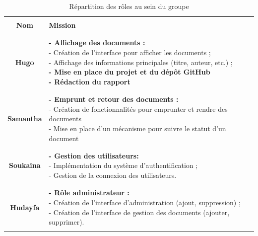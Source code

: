 \documentclass[12pt,a4paper]{article}
\begin{document}
\begin{table}[!h]
	\centering
		\begin{tabular}{|c|l|}
			\hline
			& \\
			\textbf{Nom} & \textbf{Mission} \\ 
			& \\\hline
			& \\
			\textbf{Hugo} & \makecell[l]{\textbf{- Affichage des documents :} \\ \hspace{.5cm} - Création de l'interface pour afficher les documents ; \\ \hspace{.5cm} - Affichage des informations principales (titre, auteur, etc.) ; \\ \textbf{- Mise en place du projet et du dépôt GitHub} \\ \textbf{- Rédaction du rapport}}\\ 
			& \\ \hline
			& \\
			\textbf{Samantha} & \makecell[l]{\textbf{- Emprunt et retour des documents :} \\ \hspace{.5cm} - Création de fonctionnalités pour emprunter et rendre des documents \\ \hspace{.5cm} - Mise en place d'un mécanisme pour suivre le statut d'un document } \\ 
			& \\ \hline
			& \\
			\textbf{Soukaina} & \makecell[l]{ \textbf{- Gestion des utilisateurs: }\\ \hspace{.5cm} - Implémentation du système d'authentification ;\\ \hspace{.5cm} - Gestion de la connexion des utilisateurs.}\\ 
			& \\ \hline
			& \\
			\textbf{Hudayfa} & \makecell[l]{ \textbf{- Rôle administrateur :} \\  \hspace{.5cm}- Création de l'interface d'administration (ajout, suppression) ; \\ \hspace{.5cm}- Création de l'interface de gestion des documents (ajouter, supprimer).} \\
			& \\ \hline
		\end{tabular}
	\caption{Répartition des rôles au sein du groupe}
\end{table}	
\end{document}
